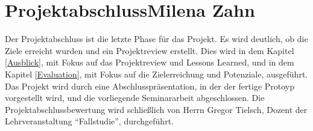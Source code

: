 	\section[Projektabschluss]{Projektabschluss{\hfill \normalsize Milena Zahn}} 
	Der Projektabschluss ist die letzte Phase für das Projekt. Es wird deutlich, ob die Ziele erreicht wurden und ein Projektreview erstellt. Dies wird in dem Kapitel \vref{Ausblick}, mit Fokus auf das Projektreview und Lessons Learned, und in dem Kapitel \vref{Evaluation}, mit Fokus auf die Zielerreichung und Potenziale, ausgeführt. Das Projekt wird durch eine Abschlusspräsentation, in der der fertige Protoyp vorgestellt wird, und die vorliegende Seminararbeit abgeschlossen. Die Projektabschlussbewertung wird schließlich von Herrn Gregor Tielsch, Dozent der Lehrveranstaltung \enquote{Fallstudie}, durchgeführt.